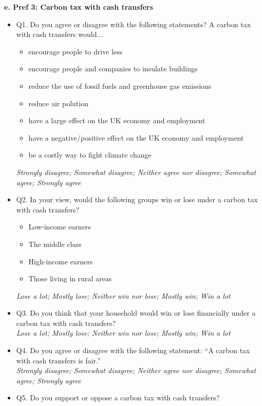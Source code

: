 \documentclass{article}
\begin{document}
\begin{flushleft}
\textbf{e. Pref 3: Carbon tax with cash transfers}
\end{flushleft}

\begin{itemize}
    \item Q1. Do you agree or disagree with the following statements? A carbon tax with cash transfers would... 
    \begin{itemize}
        \item encourage people to drive less
        \item encourage people and companies to insulate buildings
        \item reduce the use of fossil fuels and greenhouse gas emissions
        \item reduce air polution
        \item have a large effect on the UK economy and employment
        \item have a negative/positive effect on the UK economy and employment
        \item be a costly way to fight climate change
    \end{itemize}
    \textit{Strongly disagree; Somewhat disagree; Neither agree nor disagree; Somewhat agree; Strongly agree}
    \item Q2. In your view, would the following groups win or lose under a carbon tax with cash transfers?
    \begin{itemize}
        \item Low-income earners
        \item The middle class
        \item High-income earners
        \item Those living in rural areas
    \end{itemize}
    \textit{Lose a lot; Mostly lose; Neither win nor lose; Mostly win; Win a lot}
    \item Q3. Do you think that your household would win or lose financially under a carbon tax with cash transfers? \\
    \textit{Lose a lot; Mostly lose; Neither win nor lose; Mostly win; Win a lot}
    \item Q4. Do you agree or disagree with the following statement: ``A carbon tax with cash transfers is fair.'' \\
    \textit{Strongly disagree; Somewhat disagree; Neither agree nor disagree; Somewhat agree; Strongly agree}
    \item Q5. Do you support or oppose a carbon tax with cash transfers? \\

\end{itemize}
\end{document}
